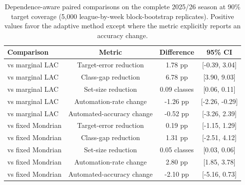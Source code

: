 \begin{table}[tbp]
\centering
\small
\setlength{\tabcolsep}{5pt}
\caption{Dependence-aware paired comparisons on the complete 2025/26 season at 90\% target coverage (5,000 league-by-week block-bootstrap replicates). Positive values favor the adaptive method except where the metric explicitly reports an accuracy change.}
\label{tab:paired-conformal}
\begin{tabular}{lccc}
\toprule
Comparison & Metric & Difference & 95\% CI \\
\midrule
vs marginal LAC & Target-error reduction & 1.78 pp & [-0.39, 3.04] \\
vs marginal LAC & Class-gap reduction & 6.78 pp & [3.90, 9.03] \\
vs marginal LAC & Set-size reduction & 0.09 classes & [0.06, 0.11] \\
vs marginal LAC & Automation-rate change & -1.26 pp & [-2.26, -0.29] \\
vs marginal LAC & Automated-accuracy change & -0.52 pp & [-3.26, 2.39] \\
vs fixed Mondrian & Target-error reduction & 0.19 pp & [-1.15, 1.29] \\
vs fixed Mondrian & Class-gap reduction & 1.31 pp & [-2.51, 4.12] \\
vs fixed Mondrian & Set-size reduction & 0.05 classes & [0.03, 0.06] \\
vs fixed Mondrian & Automation-rate change & 2.80 pp & [1.85, 3.78] \\
vs fixed Mondrian & Automated-accuracy change & -2.10 pp & [-5.16, 0.73] \\
\bottomrule
\end{tabular}
\end{table}
